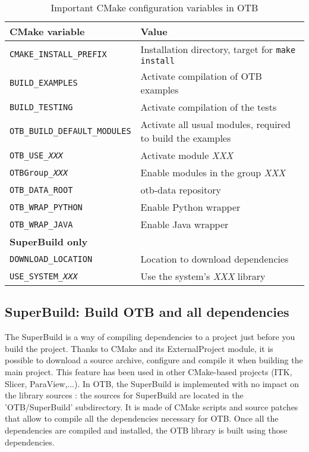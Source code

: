 \begin{center}
\begin{tiny}
\begin{table}[!htbp]
\begin{tabular}{p{}p{}}
\hline
\textbf{CMake variable} & \textbf{Value} \\
\hline
\texttt{CMAKE\_INSTALL\_PREFIX}         & Installation directory, target for \texttt{make install} \\
\texttt{BUILD\_EXAMPLES}                & Activate compilation of OTB examples \\
\texttt{BUILD\_TESTING}                 & Activate compilation of the tests \\
\texttt{OTB\_BUILD\_DEFAULT\_MODULES}   & Activate all usual modules, required to build the examples \\
\texttt{OTB\_USE\_\textit{XXX}}         & Activate module \textit{XXX} \\
\texttt{OTBGroup\_\textit{XXX}}         & Enable modules in the group \textit{XXX} \\
\texttt{OTB\_DATA\_ROOT}                & otb-data repository \\
\texttt{OTB\_WRAP\_PYTHON}              & Enable Python wrapper \\
\texttt{OTB\_WRAP\_JAVA}                & Enable Java wrapper \\

\hline
\multicolumn{2}{l}{\small \textbf{SuperBuild only}} \\ 
\texttt{DOWNLOAD\_LOCATION}             & Location to download dependencies \\
\texttt{USE\_SYSTEM\_\textit{XXX}}      & Use the system's \textit{XXX} library \\

\hline
\end{tabular}
\caption{Important CMake configuration variables in OTB}
\label{tab:installation-cmake-variables}
\end{table}
\end{tiny}
\end{center}

\subsection{SuperBuild: Build OTB and all dependencies}
\label{sec:installation-linux-superbuild}

The SuperBuild is a way of compiling dependencies to a project just before you
build the project. Thanks to CMake and its ExternalProject module, it is
possible to download a source archive, configure and compile it when building
the main project. This feature has been used in other CMake-based projects (ITK,
Slicer, ParaView,...).  In OTB, the SuperBuild is implemented with no impact on
the library sources : the sources for SuperBuild are located in the
'OTB/SuperBuild' subdirectory. It is made of CMake scripts and source patches
that allow to compile all the dependencies necessary for OTB. Once all the
dependencies are compiled and installed, the OTB library is built using those
dependencies.

